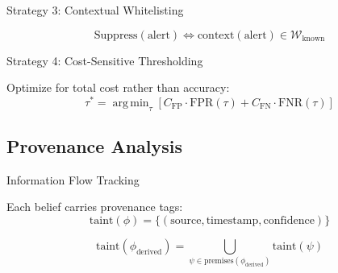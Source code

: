 \documentclass[
  ignorenonframetext,
]{beamer}
\DeclareMathOperator*{\argmin}{arg\,min}
\begin{document}
\begin{frame}[allowframebreaks]{Strategy 3: Contextual Whitelisting}
\protect{}\label{strategy-3-contextual-whitelisting}
\begin{definition}
\label{def:context-whitelist}
\begin{equation}
\label{eq:whitelist-suppress}
\text{Suppress}(\text{alert}) \iff \text{context}(\text{alert}) \in \mathcal{W}_{\text{known}}
\end{equation}
\end{definition}
\end{frame}

\begin{frame}[allowframebreaks]{Strategy 4: Cost-Sensitive Thresholding}
\protect{}\label{strategy-4-cost-sensitive-thresholding}
\begin{definition}
\label{def:cost-threshold}
Optimize for total cost rather than accuracy:
\begin{equation}
\label{eq:cost-threshold}
\tau^* = \argmin_\tau \left[ C_{\text{FP}} \cdot \text{FPR}(\tau) + C_{\text{FN}} \cdot \text{FNR}(\tau) \right]
\end{equation}
\end{definition}
\end{frame}

\subsection{Provenance Analysis}\label{sec:provenance}

\begin{frame}[allowframebreaks]{Information Flow Tracking}
\protect{}\label{information-flow-tracking}
\begin{definition}
\label{def:taint-label}
Each belief carries provenance tags:
\begin{equation}
\label{eq:taint-label}
\text{taint}(\phi) = \{(\text{source}, \text{timestamp}, \text{confidence})\}
\end{equation}
\end{definition}

\begin{definition}
\label{def:taint-propagation}
\begin{equation}
\label{eq:taint-propagation}
\text{taint}(\phi_{\text{derived}}) = \bigcup_{\psi \in \text{premises}(\phi_{\text{derived}})} \text{taint}(\psi)
\end{equation}
\end{definition}

\end{frame}
\end{document}
